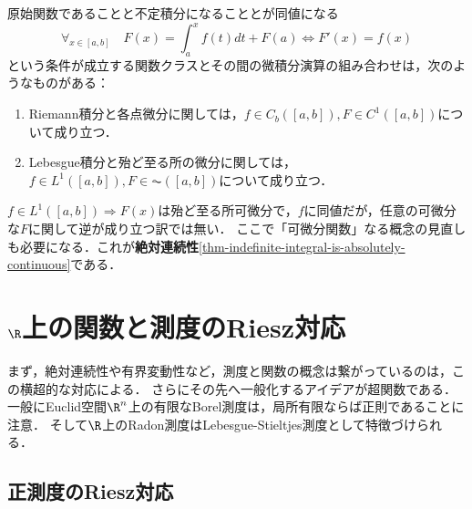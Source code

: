 \documentclass[uplatex, dvipdfmx]{jsreport}
\begin{document}
\begin{theorem}[微積分の基本定理]
    原始関数であることと不定積分になることとが同値になる
    \[\forall_{x\in[a,b]}\quad F(x)=\int^x_af(t)dt+F(a)\Leftrightarrow F'(x)=f(x)\]
    という条件が成立する関数クラスとその間の微積分演算の組み合わせは，次のようなものがある：
    \begin{enumerate}
        \item Riemann積分と各点微分に関しては，$f\in C_b([a,b]),F\in C^1([a,b])$について成り立つ．
        \item Lebesgue積分と殆ど至る所の微分に関しては，$f\in L^1([a,b]),F\in\AC([a,b])$について成り立つ．
    \end{enumerate}
\end{theorem}
\begin{remarks}
    $f\in L^1([a,b])\Rightarrow F(x)$は殆ど至る所可微分で，$f$に同値だが，任意の可微分な$F$に関して逆が成り立つ訳では無い．
    ここで「可微分関数」なる概念の見直しも必要になる．これが\textbf{絶対連続性}\ref{thm-indefinite-integral-is-absolutely-continuous}である．
\end{remarks}

\section{$\R$上の関数と測度のRiesz対応}

\begin{tcolorbox}[colframe=ForestGreen, colback=ForestGreen!10!white,breakable,colbacktitle=ForestGreen!40!white,coltitle=black,fonttitle=\bfseries\sffamily,
title=微積分学の基本定理の最終到達形]
    まず，絶対連続性や有界変動性など，測度と関数の概念は繋がっているのは，この横超的な対応による．
    さらにその先へ一般化するアイデアが超関数である．
    一般にEuclid空間$\R^n$上の有限なBorel測度は，局所有限ならば正則であることに注意．
    そして$\R$上のRadon測度はLebesgue-Stieltjes測度として特徴づけられる．
\end{tcolorbox}

\subsection{正測度のRiesz対応}
\end{document}
